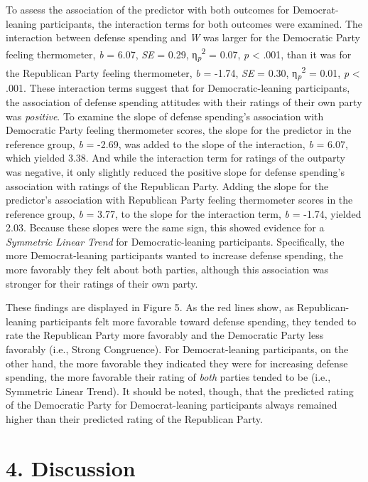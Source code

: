 \documentclass[authordate, meta, issue]{jote-new-article}
\begin{document}
	To assess the association of the predictor with both outcomes for Democrat-leaning participants, the interaction terms for both outcomes were examined. The interaction between defense spending and \emph{W} was larger for the Democratic Party feeling thermometer, \emph{b} = 6.07, \emph{SE} = 0.29, η\textsubscript{\emph{p}}\textsuperscript{2} = 0.07, \emph{p }< .001, than it was for the Republican Party feeling thermometer, \emph{b} = -1.74, \emph{SE} = 0.30, η\textsubscript{\emph{p}}\textsuperscript{2} = 0.01​, \emph{p }< .001. These interaction terms suggest that for Democratic-leaning participants, the association of defense spending attitudes with their ratings of their own party was \emph{positive}. To examine the slope of defense spending's association with Democratic Party feeling thermometer scores, the slope for the predictor in the reference group, \emph{b }= -2.69, was added to the slope of the interaction, \emph{b }= 6.07, which yielded 3.38. And while the interaction term for ratings of the outparty was negative, it only slightly reduced the positive slope for defense spending's association with ratings of the Republican Party. Adding the slope for the predictor's association with Republican Party feeling thermometer scores in the reference group, \emph{b }= 3.77, to the slope for the interaction term, \emph{b }= -1.74, yielded 2.03. Because these slopes were the same sign, this showed evidence for a \emph{Symmetric Linear Trend }for Democratic-leaning participants. Specifically, the more Democrat-leaning participants wanted to increase defense spending, the more favorably they felt about both parties, although this association was stronger for their ratings of their own party.



	These findings are displayed in Figure 5. As the red lines show, as Republican-leaning participants felt more favorable toward defense spending, they tended to rate the Republican Party more favorably and the Democratic Party less favorably (i.e., Strong Congruence). For Democrat-leaning participants, on the other hand, the more favorable they indicated they were for increasing defense spending, the more favorable their rating of \emph{both }parties tended to be (i.e., Symmetric Linear Trend). It should be noted, though, that the predicted rating of the Democratic Party for Democrat-leaning participants always remained higher than their predicted rating of the Republican Party.



	\section{4. Discussion}
\end{document}
